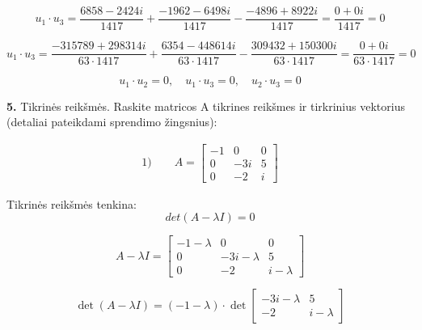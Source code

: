\documentclass{article}
\begin{document}
\begin{equation}
    u_1 \cdot u_3 = \frac{6858-2424i}{1417} + \frac{-1962-6498i}{1417} - \frac{-4896+8922i}{1417} = \frac{0 + 0i}{1417} = 0 \nonumber
\end{equation}


\begin{equation}
    u_1 \cdot u_3 = \frac{-315789+298314i}{63\cdot1417} + \frac{6354-448614i}{63\cdot1417} - \frac{309432+150300i}{63\cdot1417} = \frac{0 + 0i}{63\cdot1417} = 0 \nonumber
\end{equation}

\begin{equation}
    u_1\cdot u_2 = 0, \quad u_1\cdot u_3 = 0,\quad u_2\cdot u_3 = 0 \nonumber
\end{equation}







\pagebreak



\textbf{5.} Tikrinės reikšmės. Raskite matricos  A  tikrines reikšmes ir tirkrinius vektorius (detaliai pateikdami sprendimo žingsnius):

\begin{align}
\text{1)}\qquad
A=
\begin{bmatrix}
-1 & 0 & 0 \\
0 & -3i & 5 \\
0 & -2 & i
\end{bmatrix}
\nonumber
\end{align}

Tikrinės reikšmės tenkina:
\begin{equation}
 det(A-\lambda I) = 0 \nonumber
\end{equation}

\begin{equation}
A-\lambda I =
    \begin{bmatrix}
        -1-\lambda & 0 & 0 \\
        0 & -3i-\lambda & 5 \\
        0 & -2 & i-\lambda
    \end{bmatrix}\nonumber
\end{equation}

\begin{equation}
\det(A - \lambda I) = (-1 - \lambda) \cdot \det\begin{bmatrix}
-3i - \lambda & 5 \\
-2 & i - \lambda\nonumber
\end{bmatrix}
\end{equation}
\end{document}
